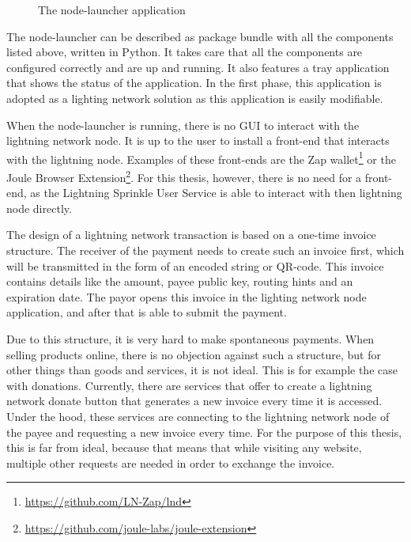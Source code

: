 
\begin{figure}[h!]
  \setlength{\fboxsep}{0pt}%
  \center
  \caption{The node-launcher application}
\end{figure}

The node-launcher can be described as package bundle with all the components listed above, written in Python. It takes care that all the components are configured correctly and are up and running. It also features a tray application that shows the status of the application. In the first phase, this application is adopted as a lighting network solution as this application is easily modifiable.

When the node-launcher is running, there is no GUI to interact with the lightning network node. It is up to the user to install a front-end that interacts with the lightning node. Examples of these front-ends are the Zap wallet\footnote{\url{https://github.com/LN-Zap/lnd}} or the Joule Browser Extension\footnote{\url{https://github.com/joule-labs/joule-extension}}. For this thesis, however, there is no need for a front-end, as the Lightning Sprinkle User Service is able to interact with then lightning node directly. 

The design of a lightning network transaction is based on a one-time invoice structure. The receiver of the payment needs to create such an invoice first, which will be transmitted in the form of an encoded string or QR-code. This invoice contains details like the amount, payee public key, routing hints and an expiration date. The payor opens this invoice in the lighting network node application, and after that is able to submit the payment.

Due to this structure, it is very hard to make spontaneous payments. When selling products online, there is no objection against such a structure, but for other things than goods and services, it is not ideal. This is for example the case with donations. Currently, there are services that offer to create a lightning network donate button that generates a new invoice every time it is accessed. Under the hood, these services are connecting to the lightning network node of the payee and requesting a new invoice every time. For the purpose of this thesis, this is far from ideal, because that means that while visiting any website, multiple other requests are needed in order to exchange the invoice. 

